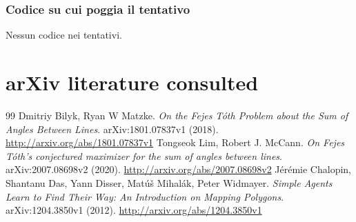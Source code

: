 \documentclass[11pt,a4paper]{article}
\begin{document}
\subsubsection{Codice su cui poggia il tentativo}
Nessun codice nei tentativi.

\section{arXiv literature consulted}
\begin{thebibliography}{99}
 Dmitriy Bilyk, Ryan W Matzke. \emph{On the Fejes Tóth Problem about the Sum of Angles Between Lines}. arXiv:1801.07837v1 (2018). \url{http://arxiv.org/abs/1801.07837v1}
 Tongseok Lim, Robert J. McCann. \emph{On Fejes Tóth's conjectured maximizer for the sum of angles between lines}. arXiv:2007.08698v2 (2020). \url{http://arxiv.org/abs/2007.08698v2}
 Jérémie Chalopin, Shantanu Das, Yann Disser, Matúš Mihalák, Peter Widmayer. \emph{Simple Agents Learn to Find Their Way: An Introduction on Mapping Polygons}. arXiv:1204.3850v1 (2012). \url{http://arxiv.org/abs/1204.3850v1}
\end{thebibliography}
\end{document}
